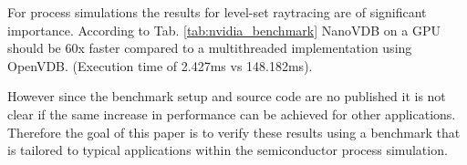 For process simulations the results for level-set raytracing are of significant importance. 
According to Tab. \ref{tab:nvidia_benchmark} NanoVDB on a GPU should be 60x faster compared to a multithreaded implementation using OpenVDB. (Execution time of 2.427ms vs 148.182ms).

However since the benchmark setup and source code are no published it is not clear if the same increase in performance can be achieved for other applications.
Therefore the goal of this paper is to verify these results using a benchmark that is tailored to typical applications within the semiconductor process simulation.


